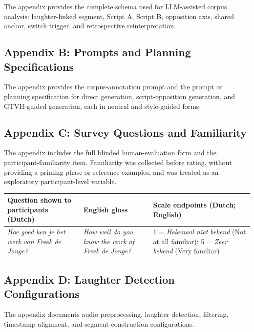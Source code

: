 \documentclass[11pt]{article}
\begin{document}
The appendix provides the complete schema used for LLM-assisted corpus analysis: laughter-linked segment, Script A, Script B, opposition axis, shared anchor, switch trigger, and retrospective reinterpretation.

\subsection{Appendix B: Prompts and Planning Specifications}\label{appendix-b-prompts-and-planning-specifications}

The appendix provides the corpus-annotation prompt and the prompt or planning specification for direct generation, script-opposition generation, and GTVH-guided generation, each in neutral and style-guided forms.

\subsection{Appendix C: Survey Questions and Familiarity}\label{appendix-c-survey-questions}

The appendix includes the full blinded human-evaluation form and the participant-familiarity item. Familiarity was collected before rating, without providing a priming phase or reference examples, and was treated as an exploratory participant-level variable.

\begin{table}[t]\centering\scriptsize\begin{tabularx}{\textwidth}{YYY}
\toprule\noalign{}
Question shown to participants (Dutch) & English gloss & Scale endpoints (Dutch; English) \\
\midrule\noalign{}

\bottomrule\noalign{}

\emph{Hoe goed ken je het werk van Freek de Jonge?} & \emph{How well do you know the work of Freek de Jonge?} & 1 = \emph{Helemaal niet bekend} (Not at all familiar); 5 = \emph{Zeer bekend} (Very familiar) \\
\end{tabularx}\end{table}

\subsection{Appendix D: Laughter Detection Configurations}\label{appendix-d-laughter-detection-configurations}

The appendix documents audio preprocessing, laughter detection, filtering, timestamp alignment, and segment-construction configurations.
\end{document}
